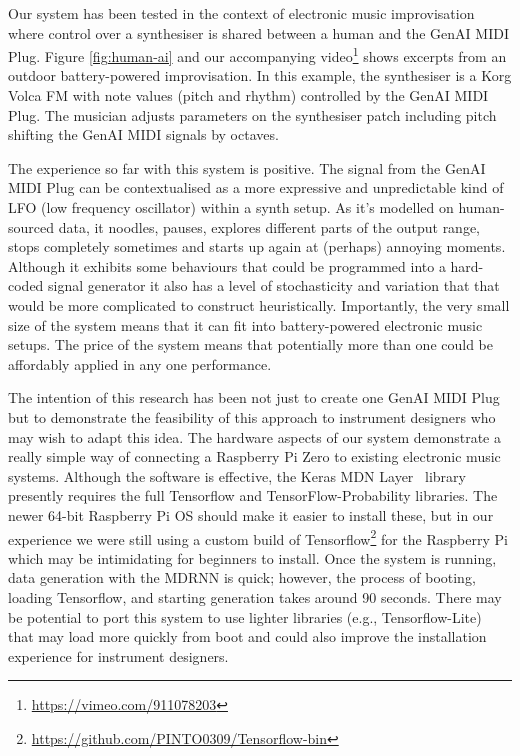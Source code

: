 \documentclass[manuscript,review,anonymous]{acmart}
\begin{document}
Our system has been tested in the context of electronic music improvisation where control over a synthesiser is shared between a human and the GenAI MIDI Plug. Figure \ref{fig:human-ai} and our accompanying video\footnote{\url{https://vimeo.com/911078203}} shows excerpts from an outdoor battery-powered improvisation. In this example, the synthesiser is a Korg Volca FM with note values (pitch and rhythm) controlled by the GenAI MIDI Plug. The musician adjusts parameters on the synthesiser patch including pitch shifting the GenAI MIDI signals by octaves.

The experience so far with this system is positive. The signal from the GenAI MIDI Plug can be contextualised as a more expressive and unpredictable kind of LFO (low frequency oscillator) within a synth setup. As it's modelled on human-sourced data, it noodles, pauses, explores different parts of the output range, stops completely sometimes and starts up again at (perhaps) annoying moments. Although it exhibits some behaviours that could be programmed into a hard-coded signal generator it also has a level of stochasticity and variation that that would be more complicated to construct heuristically. Importantly, the very small size of the system means that it can fit into battery-powered electronic music setups. The price of the system means that potentially more than one could be affordably applied in any one performance.

The intention of this research has been not just to create one GenAI MIDI Plug but to demonstrate the feasibility of this approach to instrument designers who may wish to adapt this idea.
The hardware aspects of our system demonstrate a really simple way of connecting a Raspberry Pi Zero to existing electronic music systems. 
Although the software is effective, the Keras MDN Layer~\cite{keras-mdn-layer} library presently requires the full Tensorflow and TensorFlow-Probability libraries. 
The newer 64-bit Raspberry Pi OS should make it easier to install these, but in our experience we were still using a custom build of Tensorflow\footnote{\url{https://github.com/PINTO0309/Tensorflow-bin}} for the Raspberry Pi which may be intimidating for beginners to install. 
Once the system is running, data generation with the MDRNN is quick; however, the process of booting, loading Tensorflow, and starting generation takes around 90 seconds. 
There may be potential to port this system to use lighter libraries (e.g., Tensorflow-Lite) that may load more quickly from boot and could also improve the installation experience for instrument designers.
\end{document}
